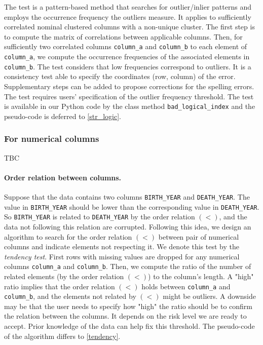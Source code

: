 \documentclass{article}
\begin{document}
The test is a pattern-based method that searches for outlier/inlier patterns and employs the occurrence frequency the outliers measure.
It applies to sufficiently correlated nominal clustered columns with  a non-unique cluster.
The first step is to compute the matrix of correlations between applicable columns.
Then, for sufficiently two correlated columns \texttt{column\_a} and \texttt{column\_b} to each element of \texttt{column\_a}, we compute the occurrence frequencies of the associated elements in \texttt{column\_b}.
The test considers that low frequencies correspond to outliers.
It is a consistency test able to specify the coordinates (row, column) of the error.
Supplementary steps can be added to propose corrections for the spelling errors.
The test requires users’ specification of the outlier frequency threshold.
The test is available in our Python code by the class method \texttt{bad\_logical\_index} and the pseudo-code is deferred to \ref{str_logic}.

\subsubsection{For numerical columns} %
\label{ssub:For numerical columns}
TBC

\paragraph{Order relation between columns.} %
\label{sub:Logical order relation}
Suppose that the data contains two columns \texttt{BIRTH\_YEAR} and \texttt{DEATH\_YEAR}.
The value in \texttt{BIRTH\_YEAR} should be lower than the corresponding value in \texttt{DEATH\_YEAR}.
So \texttt{BIRTH\_YEAR} is related to \texttt{DEATH\_YEAR} by the order relation $(<)$, and the data not following this relation are corrupted.
Following this idea, we design an algorithm to search for the order relation $(<)$ between pair of numerical columns and indicate elements not respecting it.
We denote this test by the \textit{tendency test}.
First rows with missing values are dropped for any numerical columns \texttt{column\_a} and \texttt{column\_b}.
Then, we compute the ratio of the number of related elements (by the order relation $(<)$) to the column's length.
A "high" ratio implies that the order relation $(<)$ holds between \texttt{column\_a} and \texttt{column\_b}, and the elements not related by $(<)$ might be outliers.
A downside may be that the user needs to specify how "high" the ratio should be to confirm the relation between the columns.
It depends on the risk level we are ready to accept.
Prior knowledge of the data can help fix this threshold.
The pseudo-code of the algorithm differs to \ref{tendency}.
\end{document}

